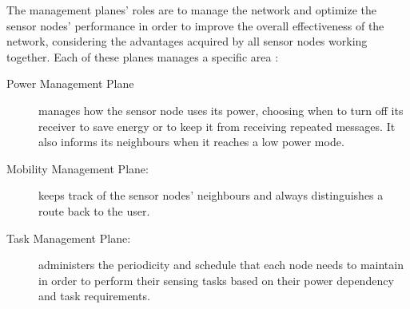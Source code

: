 The management planes' roles are to manage the network and optimize the sensor nodes'
performance in order to improve the overall effectiveness of the network, considering the
advantages acquired by all sensor nodes working together. Each of these planes manages
a specific area \cite{Akyildiz2002}:
\begin{description}
    \item[Power Management Plane] manages how the sensor node uses its power, choosing when to
        turn off its receiver to save energy or to keep it from receiving repeated messages. It
        also informs its neighbours when it reaches a low power mode.
    \item[Mobility Management Plane:] keeps track of the sensor nodes' neighbours and always
        distinguishes a route back to the user.
    \item[Task Management Plane:] administers the periodicity and schedule that each node needs
        to maintain in order to perform their sensing tasks based on their power dependency and
        task requirements.
\end{description}

